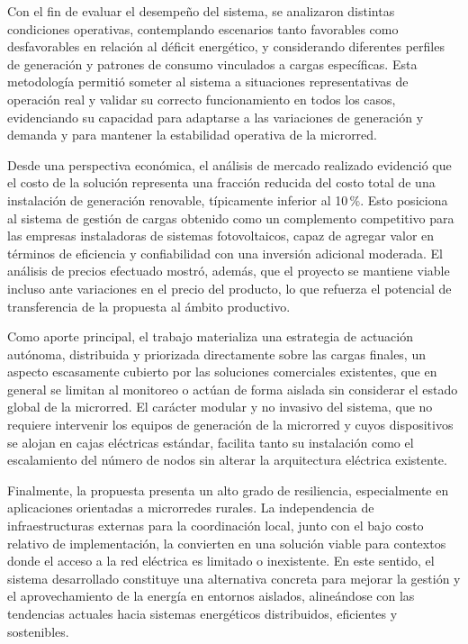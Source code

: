Con el fin de evaluar el desempeño del sistema, se analizaron distintas condiciones operativas, contemplando escenarios tanto favorables como desfavorables en relación al déficit energético, y considerando diferentes perfiles de generación y patrones de consumo vinculados a cargas específicas. Esta metodología permitió someter al sistema a situaciones representativas de operación real y validar su correcto funcionamiento en todos los casos, evidenciando su capacidad para adaptarse a las variaciones de generación y demanda y para mantener la estabilidad operativa de la microrred.

Desde una perspectiva económica, el análisis de mercado realizado evidenció que el costo de la solución representa una fracción reducida del costo total de una instalación de generación renovable, típicamente inferior al 10\,\%. Esto posiciona al sistema de gestión de cargas obtenido como un complemento competitivo para las empresas instaladoras de sistemas fotovoltaicos, capaz de agregar valor en términos de eficiencia y confiabilidad con una inversión adicional moderada. El análisis de precios efectuado mostró, además, que el proyecto se mantiene viable incluso ante variaciones en el precio del producto, lo que refuerza el potencial de transferencia de la propuesta al ámbito productivo.

Como aporte principal, el trabajo materializa una estrategia de actuación autónoma, distribuida y priorizada directamente sobre las cargas finales, un aspecto escasamente cubierto por las soluciones comerciales existentes, que en general se limitan al monitoreo o actúan de forma aislada sin considerar el estado global de la microrred. El carácter modular y no invasivo del sistema, que no requiere intervenir los equipos de generación de la microrred y cuyos dispositivos se alojan en cajas eléctricas estándar, facilita tanto su instalación como el escalamiento del número de nodos sin alterar la arquitectura eléctrica existente.

Finalmente, la propuesta presenta un alto grado de resiliencia, especialmente en aplicaciones orientadas a microrredes rurales. La independencia de infraestructuras externas para la coordinación local, junto con el bajo costo relativo de implementación, la convierten en una solución viable para contextos donde el acceso a la red eléctrica es limitado o inexistente. En este sentido, el sistema desarrollado constituye una alternativa concreta para mejorar la gestión y el aprovechamiento de la energía en entornos aislados, alineándose con las tendencias actuales hacia sistemas energéticos distribuidos, eficientes y sostenibles.
